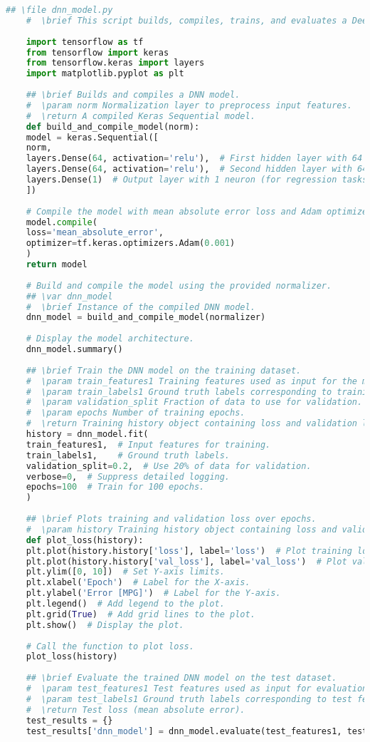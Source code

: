 	\begin{lstlisting}[language=Python]
	## \file dnn_model.py
	#  \brief This script builds, compiles, trains, and evaluates a Deep Neural Network (DNN) model.
	
	import tensorflow as tf
	from tensorflow import keras
	from tensorflow.keras import layers
	import matplotlib.pyplot as plt
	
	## \brief Builds and compiles a DNN model.
	#  \param norm Normalization layer to preprocess input features.
	#  \return A compiled Keras Sequential model.
	def build_and_compile_model(norm):
	model = keras.Sequential([
	norm,
	layers.Dense(64, activation='relu'),  # First hidden layer with 64 neurons and ReLU activation.
	layers.Dense(64, activation='relu'),  # Second hidden layer with 64 neurons and ReLU activation.
	layers.Dense(1)  # Output layer with 1 neuron (for regression tasks).
	])
	
	# Compile the model with mean absolute error loss and Adam optimizer.
	model.compile(
	loss='mean_absolute_error',
	optimizer=tf.keras.optimizers.Adam(0.001)
	)
	return model
	
	# Build and compile the model using the provided normalizer.
	## \var dnn_model
	#  \brief Instance of the compiled DNN model.
	dnn_model = build_and_compile_model(normalizer)
	
	# Display the model architecture.
	dnn_model.summary()
	
	## \brief Train the DNN model on the training dataset.
	#  \param train_features1 Training features used as input for the model.
	#  \param train_labels1 Ground truth labels corresponding to training features.
	#  \param validation_split Fraction of data to use for validation.
	#  \param epochs Number of training epochs.
	#  \return Training history object containing loss and validation loss.
	history = dnn_model.fit(
	train_features1,  # Input features for training.
	train_labels1,    # Ground truth labels.
	validation_split=0.2,  # Use 20% of data for validation.
	verbose=0,  # Suppress detailed logging.
	epochs=100  # Train for 100 epochs.
	)
	
	## \brief Plots training and validation loss over epochs.
	#  \param history Training history object containing loss and validation loss.
	def plot_loss(history):
	plt.plot(history.history['loss'], label='loss')  # Plot training loss.
	plt.plot(history.history['val_loss'], label='val_loss')  # Plot validation loss.
	plt.ylim([0, 10])  # Set Y-axis limits.
	plt.xlabel('Epoch')  # Label for the X-axis.
	plt.ylabel('Error [MPG]')  # Label for the Y-axis.
	plt.legend()  # Add legend to the plot.
	plt.grid(True)  # Add grid lines to the plot.
	plt.show()  # Display the plot.
	
	# Call the function to plot loss.
	plot_loss(history)
	
	## \brief Evaluate the trained DNN model on the test dataset.
	#  \param test_features1 Test features used as input for evaluation.
	#  \param test_labels1 Ground truth labels corresponding to test features.
	#  \return Test loss (mean absolute error).
	test_results = {}
	test_results['dnn_model'] = dnn_model.evaluate(test_features1, test_labels1, verbose=0)
\end{lstlisting}
	
